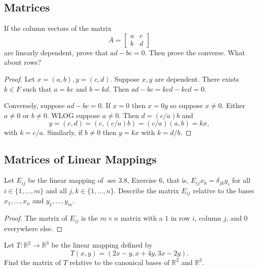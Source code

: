 \subsection{Matrices}


\begin{tcolorbox}[title=Exercise 3, breakable]
    If the column vectors of the matrix 
    \[A = \begin{bmatrix}
        a & c \\
        b & d
    \end{bmatrix}\]
    are linearly dependent, prove that $ad - bc = 0$.
    Then prove the converse. What about rows?
\end{tcolorbox}

\begin{proof}
    Let $x = (a, b), y = (c, d)$.
    Suppose $x, y$ are dependent.
    There exists $k \in F$ such that $a = kc$ and $b = kd$.
    Then $ad - bc = kcd - kcd = 0$.

    Conversely, suppose $ad - bc = 0$.
    If $x = 0$ then $x = 0y$ so suppose $x \ne 0$.
    Either $a \ne 0$ or $b \ne 0$. WLOG suppose $a \ne 0$.
    Then $d = (c/a)b$ and 
    \[y = (c, d) = (c, (c/a)b) = (c/a)(a, b) = kx,\]
    with $k = c/a$. Similarly, if $b \ne 0$ then $y = kx$ with $k = d/b$.
\end{proof}

\subsection{Matrices of Linear Mappings}

\begin{tcolorbox}[title=Exercise 2, breakable]
    Let $E_{ij}$ be the linear mapping of $\sec 3.8$, Exercise 6, that is,
    $E_{ij} x_k = \delta_{jk} y_i$ for all $i \in \{1, \ldots, m\}$ and 
    all $j, k \in \{1, \ldots, n\}$. 
    Describe the matrix $E_{ij}$ relative 
    to the bases $x_1, \ldots, x_n$ and 
    $y_1, \ldots, y_m$.
\end{tcolorbox}

\begin{proof}
    The matrix of $E_{ij}$ is the $m \times n$ matrix 
        with a $1$ in row $i$, column $j$, and $0$ everywhere else. 
\end{proof}

\begin{tcolorbox}[title=Exercise 3, breakable]
    Let $T : \mathbb{R}^2 \longrightarrow \mathbb{R}^3$
    be the linear mapping defined by 
    \[T(x, y) = (2x - y, x + 4y, 3x - 2y).\]
    Find the matrix of $T$ relative to the 
        canonical bases of $\mathbb{R}^2$
        and $\mathbb{R}^3$.
\end{tcolorbox}

